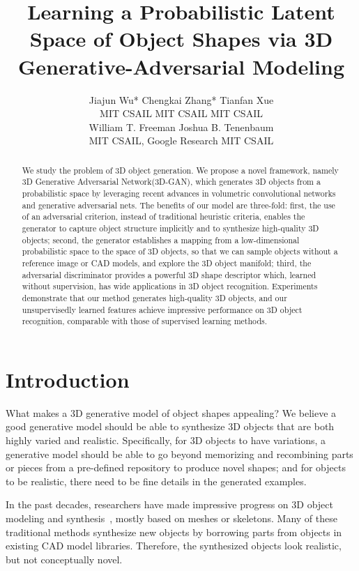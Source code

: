 \documentclass{article}
\title{Learning a Probabilistic Latent Space of Object Shapes via 3D Generative-Adversarial Modeling}
\author{Jiajun Wu* \qquad\qquad\qquad Chengkai Zhang* \qquad\qquad\qquad\; Tianfan Xue \\
MIT CSAIL \qquad\qquad\qquad\quad\; MIT CSAIL \qquad\qquad\qquad\quad\;\;\; MIT CSAIL \quad\\
\AND
William T. Freeman \qquad\qquad\qquad Joshua B. Tenenbaum\\
MIT CSAIL, Google Research \quad\qquad\qquad\quad MIT CSAIL \qquad\qquad\qquad\\
}
\newcommand{\modelfull}{3D Generative Adversarial Network\xspace}
\newcommand{\model}{3D-GAN\xspace}
\newcommand{\presection}{\vspace{-8pt}}
\newcommand{\postsection}{\vspace{-8pt}}
\begin{document}
\maketitle
{}

\vspace{-5pt}
\presection
\begin{abstract}
\postsection

We study the problem of 3D object generation. We propose a novel framework, namely \modelfull (\model), which generates 3D objects from a probabilistic space by leveraging recent advances in volumetric convolutional networks and generative adversarial nets. The benefits of our model are three-fold: first, the use of an adversarial criterion, instead of traditional heuristic criteria, enables the generator to capture object structure implicitly and to synthesize high-quality 3D objects; second, the generator establishes a mapping from a low-dimensional probabilistic space to the space of 3D objects, so that we can sample objects without a reference image or CAD models, and explore the 3D object manifold; third, the adversarial discriminator provides a powerful 3D shape descriptor which, learned without supervision, has wide applications in 3D object recognition. Experiments demonstrate that our method generates high-quality 3D objects, and our unsupervisedly learned features achieve impressive performance on 3D object recognition, comparable with those of supervised learning methods.
\vspace{-5pt}

\end{abstract}

\presection 
\section{Introduction}
\label{sec:intro}
\postsection

What makes a 3D generative model of object shapes appealing? We believe a good generative model should be able to synthesize 3D objects that are both highly varied and realistic. Specifically, for 3D objects to have variations, a generative model should be able to go beyond memorizing and recombining parts or pieces from a pre-defined repository to produce novel shapes; and for objects to be realistic, there need to be fine details in the generated examples.

In the past decades, researchers have made impressive progress on 3D object modeling and synthesis~\citep{van2011survey,tangelder2008survey,carlson1982algorithm}, mostly based on meshes or skeletons.  Many of these traditional methods synthesize new objects by borrowing parts from objects in existing CAD model libraries. Therefore, the synthesized objects look realistic, but not conceptually novel. 
\end{document}
